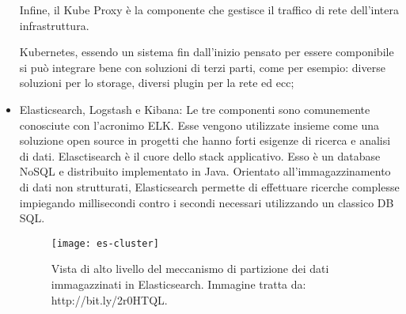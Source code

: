 \begin{itemize}
	Infine, il Kube Proxy è la componente che gestisce il traffico di rete dell'intera infrastruttura. 
	
    Kubernetes, essendo un sistema fin dall'inizio pensato per essere componibile 
    si può integrare bene con soluzioni di terzi parti, come per esempio: diverse soluzioni per lo storage, diversi plugin per la rete ed ecc;
	
	\item Elasticsearch, Logstash e Kibana: Le tre componenti sono comunemente conosciute con l'acronimo ELK.  Esse vengono utilizzate insieme come una soluzione open source in progetti che hanno forti esigenze di ricerca e analisi di dati. Elasctisearch è il cuore dello stack applicativo. Esso è un database NoSQL e distribuito implementato in Java. Orientato all'immagazzinamento di dati non strutturati, Elasticsearch permette di effettuare ricerche complesse impiegando millisecondi contro i secondi necessari utilizzando un classico DB SQL.
	
	\begin{figure}[htbp]
		\begin{center}
			\texttt{[image: es-cluster]}
			\caption{Vista di alto livello del meccanismo di partizione dei dati immagazzinati in Elasticsearch. Immagine tratta da: http://bit.ly/2r0HTQL.}
		\end{center}
	\end{figure}


\end{itemize}
